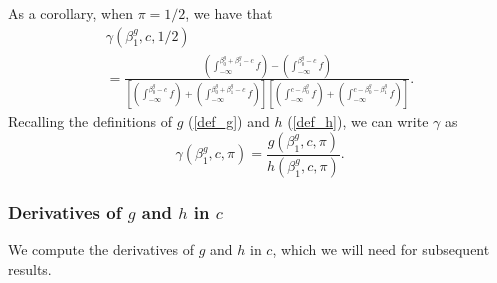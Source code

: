 \documentclass[12pt]{article}
\begin{document}
As a corollary, when $\pi = 1/2$, we have that
\begin{multline}\label{gamma_alternative_pi_half}
\gamma(\beta^g_1, c, 1/2)  \\ = \frac{\left( \int_{ -\infty}^{\beta_0^g + \beta_1^g - c} f \right) - \left( \int_{-\infty}^{ \beta_0^g - c} f \right) }{ \left[ \left( \int_{-\infty}^{ \beta_0^g - c} f \right) + \left( \int_{-\infty}^{ \beta^g_0 + \beta^g_1 - c} f \right) \right] \left[\left( \int_{-\infty}^{c - \beta^g_0} f \right) + \left(\int_{-\infty}^{c - \beta_0^g - \beta_1^g} f \right) \right]}.
\end{multline}
Recalling the definitions of $g$ (\ref{def_g}) and $h$ (\ref{def_h}), we can write $\gamma$ as
$$ \gamma(\beta^g_1, c, \pi) = \frac{g(\beta^g_1, c, \pi)}{h(\beta^g_1, c,\pi)}.$$

\subsubsection{Derivatives of  $g$ and $h$ in $c$}

We compute the derivatives of $g$ and $h$ in $c$, which we will need for subsequent results.
\end{document}
